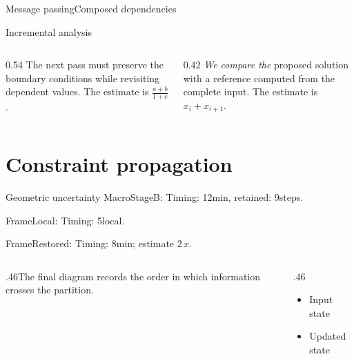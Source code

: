 \documentclass[9pt,aspectratio=169]{beamer}
\newcommand{\fuzzlayerA}[1]{\textit{#1}}
\newcommand{\fuzzterm}[1]{\fuzzlayerA{#1}}
\newcommand{\fuzzpair}[2]{\fuzzterm{#1}: #2}
\newcommand{\fuzzunit}{steps}
\let\fuzzoriginalunit\fuzzunit
\newcommand{\fuzzcoefficient}{2}
\newcommand{\fuzzscale}[2][\fuzzcoefficient]{#1\,#2}
\begin{document}
\begin{frame}[t,shrink=5]{Message passing}{Composed dependencies}
\begin{exampleblock}{Incremental analysis}
\par
\begin{columns}[onlytextwidth,t]
\begin{column}{0.54\textwidth}
\textrm{The next pass} must preserve the boundary conditions while revisiting dependent values.  The estimate is $\frac{a+b}{1+c}$.
\end{column}
\begin{column}{0.42\textwidth}
\textit{We compare the} proposed solution with a reference computed from the complete input.  The estimate is $x_i+x_{i+1}$.
\end{column}
\end{columns}
\end{exampleblock}
\par {}
\end{frame}
\renewcommand{\fuzzunit}{min}
\renewcommand{\fuzzcoefficient}{2}
\renewcommand{\fuzzterm}[1]{{\textrm{#1}}}
\section{Constraint propagation}
\begin{frame}[t]{Geometric uncertainty}
\fuzzpair{MacroStageB}{Timing: 12\fuzzunit, retained: 9\fuzzoriginalunit.}\par
{\renewcommand{\fuzzunit}{local}\fuzzpair{FrameLocal}{Timing: 5\fuzzunit.}\par}
\fuzzpair{FrameRestored}{Timing: 8\fuzzunit; estimate $\fuzzscale{x}$.}\par
\begin{columns}[T]\begin{column}{.46\textwidth}The final diagram records the order in which information crosses the partition.\end{column}\begin{column}{.46\textwidth}\begin{itemize}\item Input state\item Updated state\end{itemize}\end{column}\end{columns}
\end{frame}
\end{document}
